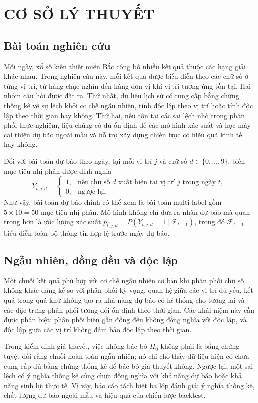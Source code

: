 \chapter{CƠ SỞ LÝ THUYẾT}

\section{Bài toán nghiên cứu}
Mỗi ngày, xổ số kiến thiết miền Bắc công bố nhiều kết quả thuộc các hạng giải khác nhau. Trong nghiên cứu này, mỗi kết quả được biểu diễn theo các chữ số ở từng vị trí, từ hàng chục nghìn đến hàng đơn vị khi vị trí tương ứng tồn tại. Hai nhóm câu hỏi được đặt ra. Thứ nhất, dữ liệu lịch sử có cung cấp bằng chứng thống kê về sự lệch khỏi cơ chế ngẫu nhiên, tính độc lập theo vị trí hoặc tính độc lập theo thời gian hay không. Thứ hai, nếu tồn tại các sai lệch nhỏ trong phân phối thực nghiệm, liệu chúng có đủ ổn định để các mô hình xác suất và học máy cải thiện dự báo ngoài mẫu và hỗ trợ xây dựng chiến lược có hiệu quả kinh tế hay không.

Đối với bài toán dự báo theo ngày, tại mỗi vị trí $j$ và chữ số $d\in\{0,\ldots,9\}$, biến mục tiêu nhị phân được định nghĩa
\[
Y_{t,j,d}=\begin{cases}
1, & \text{nếu chữ số }d\text{ xuất hiện tại vị trí }j\text{ trong ngày }t,\\
0, & \text{ngược lại.}
\end{cases}
\]
Như vậy, bài toán dự báo chính có thể xem là bài toán multi-label gồm $5\times10=50$ mục tiêu nhị phân. Mô hình không chỉ đưa ra nhãn dự báo mà quan trọng hơn là ước lượng xác suất $\hat p_{t,j,d}=P(Y_{t,j,d}=1\mid\mathcal F_{t-1})$, trong đó $\mathcal F_{t-1}$ biểu diễn toàn bộ thông tin hợp lệ trước ngày dự báo.

\section{Ngẫu nhiên, đồng đều và độc lập}
Một chuỗi kết quả phù hợp với cơ chế ngẫu nhiên cơ bản khi phân phối chữ số không khác đáng kể so với phân phối kỳ vọng, quan hệ giữa các vị trí đủ yếu, kết quả trong quá khứ không tạo ra khả năng dự báo có hệ thống cho tương lai và các đặc trưng phân phối tương đối ổn định theo thời gian. Các khái niệm này cần được phân biệt: phân phối biên gần đồng đều không đồng nghĩa với độc lập, và độc lập giữa các vị trí không đảm bảo độc lập theo thời gian.

Trong kiểm định giả thuyết, việc không bác bỏ $H_0$ không phải là bằng chứng tuyệt đối rằng chuỗi hoàn toàn ngẫu nhiên; nó chỉ cho thấy dữ liệu hiện có chưa cung cấp đủ bằng chứng thống kê để bác bỏ giả thuyết không. Ngược lại, một sai lệch có ý nghĩa thống kê cũng chưa đồng nghĩa với khả năng dự báo hoặc khả năng sinh lợi thực tế. Vì vậy, báo cáo tách biệt ba lớp đánh giá: ý nghĩa thống kê, chất lượng dự báo ngoài mẫu và hiệu quả của chiến lược backtest.

